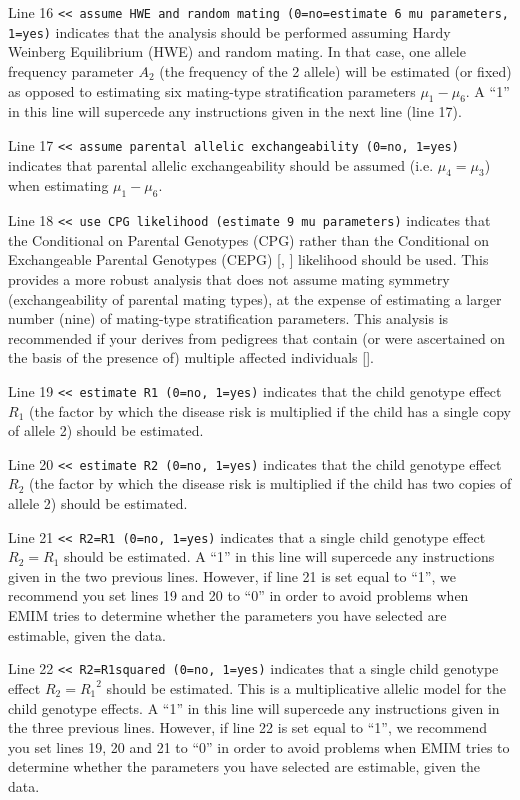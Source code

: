\documentclass[a4paper,12pt]{article}
\newcommand{\code}[1]{{\footnotesize{{\tt #1}}}}
\begin{document}
Line 16 \code{<< assume HWE and random mating (0=no=estimate 6 mu parameters, 1=yes)} indicates that the analysis should be performed assuming Hardy Weinberg Equilibrium (HWE) and random mating. In that case, one allele frequency parameter $A_2$ (the frequency of the 2 allele) will be estimated (or fixed) as opposed to estimating six mating-type stratification parameters $\mu_1 - \mu_6$. A ``1'' in this line will supercede any instructions given in the next line (line 17). 

Line 17 \code{<< assume parental allelic exchangeability (0=no, 1=yes)} indicates that parental allelic exchangeability should be assumed (i.e. $\mu_4 = \mu_3$) when estimating $\mu_1 - \mu_6$. 

Line 18 \code{<< use CPG likelihood (estimate 9 mu parameters)} indicates that the Conditional on Parental Genotypes (CPG) rather than the Conditional on Exchangeable Parental Genotypes (CEPG) [\citet{cordell:04}, \citet{weinberg:shi:09}] likelihood should be used. This provides a more robust analysis that does not assume mating symmetry (exchangeability of parental mating types), at the expense of estimating a larger number (nine) of mating-type stratification parameters. This analysis is recommended if your derives from pedigrees that contain (or were ascertained on the basis of the presence of) multiple affected individuals [\citet{cordell:04}]. 

Line 19 \code{<< estimate R1 (0=no, 1=yes)} indicates that the child genotype effect $R_1$ (the factor by which the disease risk is multiplied if the child has a single copy of allele 2) should be estimated. 

Line 20 \code{<< estimate R2 (0=no, 1=yes)} indicates that the child genotype effect $R_2$ (the factor by which the disease risk is multiplied if the child has two copies of allele 2) should be estimated. 

Line 21 \code{<< R2=R1 (0=no, 1=yes)} indicates that a single child genotype effect $R_2=R_1$ should be estimated. A ``1'' in this line will supercede any instructions given in the two previous lines. However, if line 21 is set equal to ``1'', we recommend you set lines 19 and 20 to ``0'' in order to avoid problems when EMIM tries to determine whether the parameters you have selected are estimable, given the data. 

Line 22 \code{<< R2=R1squared (0=no, 1=yes)} indicates that a single child genotype effect $R_2={R_1}^2$ should be estimated. This is a multiplicative allelic model for the child genotype effects. A ``1'' in this line will supercede any instructions given in the three previous lines. However, if line 22 is set equal to ``1'', we recommend you set lines 19, 20 and 21 to ``0'' in order to avoid problems when EMIM tries to determine whether the parameters you have selected are estimable, given the data. 
\end{document}
